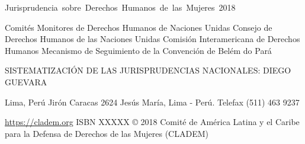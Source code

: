 \newpage
\thispagestyle{empty}

\begin{flushleft}\hbox{\Large{Jurisprudencia sobre Derechos Humanos de las Mujeres 2018}}

Comités Monitores de Derechos Humanos de Naciones Unidas
Consejo de Derechos Humanos de las Naciones Unidas
Comisión Interamericana de Derechos Humanos
Mecanismo de Seguimiento de la Convención de Belém do Pará

SISTEMATIZACIÓN DE LAS JURISPRUDENCIAS NACIONALES: DIEGO GUEVARA

Lima, Perú
Jirón Caracas 2624 Jesús María, Lima - Perú. Telefax (511) 463 9237

\vfill
\url{https://cladem.org}
ISBN XXXXX
© 2018 Comité de América Latina y el Caribe para la Defensa de Derechos de las Mujeres (CLADEM)

\end{flushleft}
\newpage

